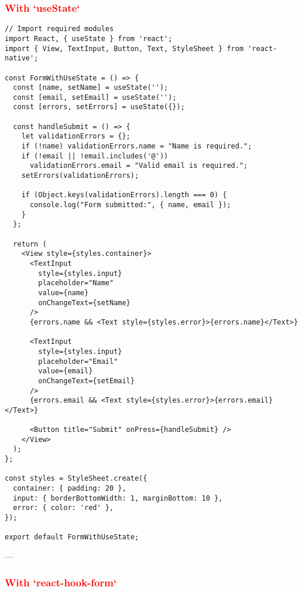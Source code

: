 \documentclass[12pt]{article}
\begin{document}
\subsubsection*{\textcolor{red}{With `useState`}}

\begin{tcolorbox}[colback=gray!5, colframe=gray!50, title=React Native Code Example (With `useState`)]
\begin{lstlisting}[style=customJavaScript]
// Import required modules
import React, { useState } from 'react';
import { View, TextInput, Button, Text, StyleSheet } from 'react-native';

const FormWithUseState = () => {
  const [name, setName] = useState('');
  const [email, setEmail] = useState('');
  const [errors, setErrors] = useState({});

  const handleSubmit = () => {
    let validationErrors = {};
    if (!name) validationErrors.name = "Name is required.";
    if (!email || !email.includes('@')) 
      validationErrors.email = "Valid email is required.";
    setErrors(validationErrors);

    if (Object.keys(validationErrors).length === 0) {
      console.log("Form submitted:", { name, email });
    }
  };

  return (
    <View style={styles.container}>
      <TextInput
        style={styles.input}
        placeholder="Name"
        value={name}
        onChangeText={setName}
      />
      {errors.name && <Text style={styles.error}>{errors.name}</Text>}

      <TextInput
        style={styles.input}
        placeholder="Email"
        value={email}
        onChangeText={setEmail}
      />
      {errors.email && <Text style={styles.error}>{errors.email}</Text>}

      <Button title="Submit" onPress={handleSubmit} />
    </View>
  );
};

const styles = StyleSheet.create({
  container: { padding: 20 },
  input: { borderBottomWidth: 1, marginBottom: 10 },
  error: { color: 'red' },
});

export default FormWithUseState;
\end{lstlisting}
\end{tcolorbox}

---

\subsubsection*{\textcolor{red}{With `react-hook-form`}}
\end{document}
